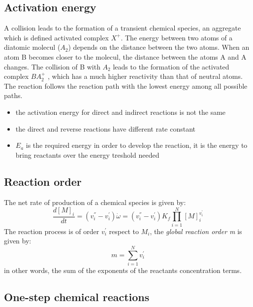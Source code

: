 \documentclass[12pt]{article}
\begin{document}
\subsection{Activation energy}

A collision leads to the formation of a transient chemical species, an aggregate which is defined activated complex $X^{+}$. The energy between two atoms of a diatomic molecul ($A_{2}$) depends on the distance between the two atoms. When an atom B becomes closer to the molecul, the distance between the atoms A and A changes. The collision of B with $A_{2}$ leads to the formation of the activated complex $BA_{2}^{+}$ , which has a much higher reactivity than that of neutral atoms.\\
The reaction follows the reaction path with the lowest energy among all possible paths.

\begin{itemize}
    \item the activation energy for direct and indirect reactions is not the same
    \item the direct and reverse reactions have different rate constant
    \item $E_{a}$ is the required energy in order to develop the reaction, it is the energy to bring reactants over the energy treshold needed
\end{itemize}

\subsection{Reaction order}

The net rate of production of a chemical species is given by:
\begin{equation}
    \frac{d[M]_{i}}{dt} = (v_{i}^{''}-v_{i}^{'})\dot{\omega}=(v_{i}^{''}-v_{i}^{'})K_{f}\prod_{i=1}^{N}[M]_{i}^{v_{i}^{'}}
\end{equation}
The reaction process is of order $v_{i}^{'}$ respect to $M_{i}$, the \textit{global reaction order m} is given by:
\begin{equation}
    m = \sum_{i=1}^{N}v_{i}^{'}
\end{equation}
in other words, the sum of the exponents of the reactants concentration terms.

\subsection{One-step chemical reactions}
\end{document}
